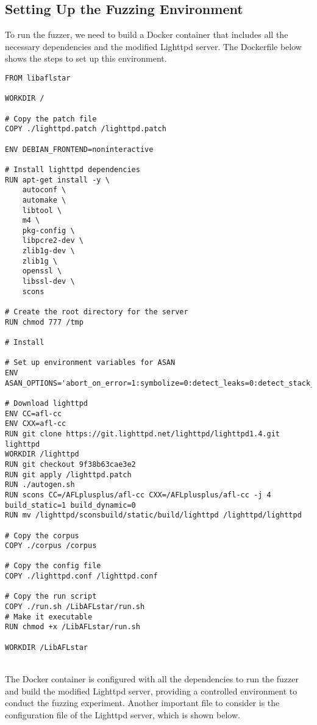 \subsection{Setting Up the Fuzzing Environment}

To run the fuzzer, we need to build a Docker container that includes all the necessary dependencies and the modified Lighttpd server. The Dockerfile below shows the steps to set up this environment.

\begin{lstlisting}
FROM libaflstar 

WORKDIR /

# Copy the patch file
COPY ./lighttpd.patch /lighttpd.patch

ENV DEBIAN_FRONTEND=noninteractive

# Install lighttpd dependencies
RUN apt-get install -y \
    autoconf \
    automake \
    libtool \
    m4 \
    pkg-config \
    libpcre2-dev \
    zlib1g-dev \
    zlib1g \
    openssl \
    libssl-dev \
    scons

# Create the root directory for the server
RUN chmod 777 /tmp

# Install

# Set up environment variables for ASAN
ENV ASAN_OPTIONS='abort_on_error=1:symbolize=0:detect_leaks=0:detect_stack_use_after_return=1:detect_container_overflow=0:poison_array_cookie=0:malloc_fill_byte=0:max_malloc_fill_size=16777216'

# Download lighttpd
ENV CC=afl-cc
ENV CXX=afl-cc
RUN git clone https://git.lighttpd.net/lighttpd/lighttpd1.4.git lighttpd
WORKDIR /lighttpd 
RUN git checkout 9f38b63cae3e2
RUN git apply /lighttpd.patch
RUN ./autogen.sh  
RUN scons CC=/AFLplusplus/afl-cc CXX=/AFLplusplus/afl-cc -j 4 build_static=1 build_dynamic=0
RUN mv /lighttpd/sconsbuild/static/build/lighttpd /lighttpd/lighttpd

# Copy the corpus
COPY ./corpus /corpus

# Copy the config file
COPY ./lighttpd.conf /lighttpd.conf

# Copy the run script
COPY ./run.sh /LibAFLstar/run.sh
# Make it executable
RUN chmod +x /LibAFLstar/run.sh

WORKDIR /LibAFLstar
\end{lstlisting}
\phantom{}\\
The Docker container is configured with all the dependencies to run the fuzzer and build the modified Lighttpd server, providing a controlled environment to conduct the fuzzing experiment.
Another important file to consider is the configuration file of the Lighttpd server, which is shown below.\\
